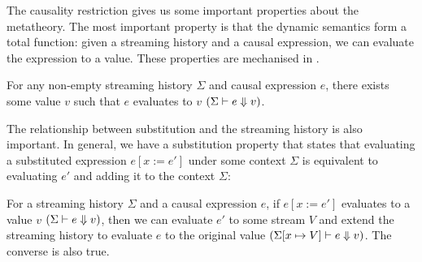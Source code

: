 The causality restriction gives us some important properties about the metatheory.
The most important property is that the dynamic semantics form a total function: given a streaming history and a causal expression, we can evaluate the expression to a value.
These properties are mechanised in \fstar{}.


\begin{theorem}
  For any non-empty streaming history $\Sigma$ and causal expression $e$, there exists some value $v$ such that $e$ evaluates to $v$ $(\Sigma \vdash e \Downarrow v)$.
\end{theorem}

The relationship between substitution and the streaming history is also important.
In general, we have a substitution property that states that evaluating a substituted expression $e[x := e']$ under some context $\Sigma$ is equivalent to evaluating $e'$ and adding it to the context $\Sigma$:

\begin{theorem}
  For a streaming history $\Sigma$ and a causal expression $e$, if $e[x := e']$ evaluates to a value $v$ $(\Sigma \vdash e \Downarrow v)$, then we can evaluate $e'$ to some stream $V$ and extend the streaming history to evaluate $e$ to the original value $(\Sigma[x \mapsto V] \vdash e \Downarrow v)$.
  The converse is also true.
\end{theorem}


